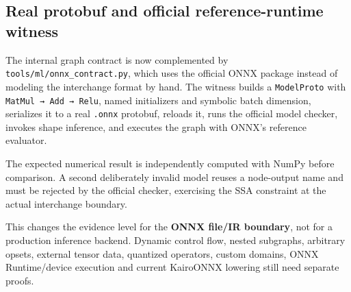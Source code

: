 \subsection{Real protobuf and official reference-runtime witness}\label{appendix-a87217e3af2b-real-protobuf-and-official-reference-runtime-witness}

\hypertarget{appendix-a87217e3af2b-real-protobuf-and-official-reference-runtime-witness}{}

The internal graph contract is now complemented by \texttt{tools/ml/onnx\_contract.py}, which uses the official ONNX package instead of modeling the interchange format by hand. The witness builds a \texttt{ModelProto} with \texttt{MatMul\ →\ Add\ →\ Relu}, named initializers and symbolic batch dimension, serializes it to a real \texttt{.onnx} protobuf, reloads it, runs the official model checker, invokes shape inference, and executes the graph with ONNX's reference evaluator.

The expected numerical result is independently computed with NumPy before comparison. A second deliberately invalid model reuses a node-output name and must be rejected by the official checker, exercising the SSA constraint at the actual interchange boundary.

This changes the evidence level for the \textbf{ONNX file/IR boundary}, not for a production inference backend. Dynamic control flow, nested subgraphs, arbitrary opsets, external tensor data, quantized operators, custom domains, ONNX Runtime/device execution and current KairoONNX lowering still need separate proofs.
